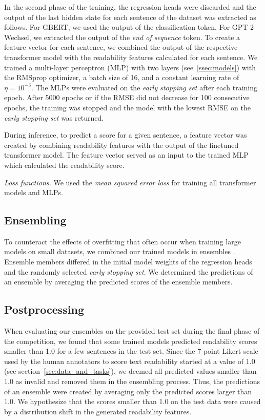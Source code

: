 \documentclass[11pt,a4paper]{article}
\begin{document}
In the second phase of the training, the regression heads were discarded and the output of the last hidden state for each sentence of the dataset was extracted as follows.
For GBERT, we used the output of the classification token.
For \mbox{GPT-2-Wechsel}, we extracted the output of the \emph{end of sequence} token.
To create a feature vector for each sentence, we combined the output of the respective transformer model with the readability features calculated for each sentence.
We trained a multi-layer perceptron (MLP) with two layers (see~\ref{ssec:models}) with the RMSprop optimizer, a batch size of 16, and a constant learning rate of $\eta=10^{-3}$.
The MLPs were evaluated on the \emph{early stopping set} after each training epoch.
After 5000 epochs or if the RMSE did not decrease for 100 consecutive epochs, the training was stopped and the model with the lowest RMSE on the \emph{early stopping set} was returned.

During inference, to predict a score for a given sentence, a feature vector was created by combining readability features with the output of the finetuned transformer model. The feature vector served as an input to the trained MLP which calculated the readability score.

\emph{Loss functions.} We used the \emph{mean squared error loss} for training all transformer models and MLPs.
 
\subsection{Ensembling}
\label{ssec:ensembling}

To counteract the effects of overfitting that often occur when training large models on small datasets, we combined our trained models in ensembles \cite{Risch2020,Bornheim2021}.
Ensemble members differed in the initial model weights of the regression heads and the randomly selected \emph{early stopping set}.
We determined the predictions of an ensemble by averaging the predicted scores of the ensemble members.

\subsection{Postprocessing}
When evaluating our ensembles on the provided test set during the final phase of the competition, we found that some trained models predicted readability scores smaller than 1.0 for a few sentences in the test set.
Since the 7-point Likert scale used by the human annotators to score text readability started at a value of 1.0 (see section~\ref{sec:data_and_tasks}), we deemed all predicted values smaller than 1.0 as invalid and removed them in the ensembling process.
Thus, the predictions of an ensemble were created by averaging only the predicted scores larger than 1.0.
We hypothesize that the scores smaller than 1.0 on the test data were caused by a distribution shift in the generated readability features.
 
\end{document}
